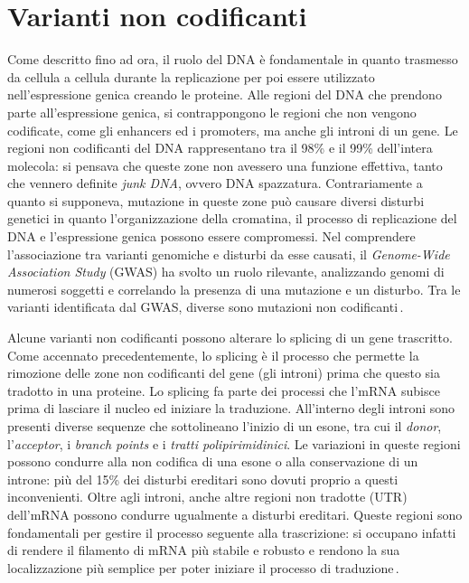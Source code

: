 \section{Varianti non codificanti}

Come descritto fino ad ora, il ruolo del \acs{DNA} è fondamentale in quanto trasmesso da cellula a cellula durante la replicazione per poi essere utilizzato nell'espressione genica creando le proteine. Alle regioni del \acs{DNA} che prendono parte all'espressione genica, si contrappongono le regioni che non vengono codificate, come gli enhancers ed i promoters, ma anche gli introni di un gene. Le regioni non codificanti del \acs{DNA} rappresentano tra il 98\% e il 99\% dell'intera molecola: si pensava che queste zone non avessero una funzione effettiva, tanto che vennero definite \textit{junk \acs{DNA}}, ovvero \acs{DNA} spazzatura. Contrariamente a quanto si supponeva, mutazione in queste zone può causare diversi disturbi genetici in quanto l'organizzazione della cromatina, il processo di replicazione del \acs{DNA} e l'espressione genica possono essere compromessi. Nel comprendere l'associazione tra varianti genomiche e disturbi da esse causati, il \textit{Genome-Wide Association Study} (\acs{GWAS}) ha svolto un ruolo rilevante, analizzando genomi di numerosi soggetti e correlando la presenza di una mutazione e un disturbo. Tra le varianti identificata dal \acs{GWAS}, diverse sono mutazioni non codificanti\,\cite{visscher2012five, zhang2015non, ludwig2002functional}.

Alcune varianti non codificanti possono alterare lo splicing di un gene trascritto. Come accennato precedentemente, lo splicing è il processo che permette la rimozione delle zone non codificanti del gene (gli introni) prima che questo sia tradotto in una proteine. Lo splicing fa parte dei processi che l'\acs{mRNA} subisce prima di lasciare il nucleo ed iniziare la traduzione. All'interno degli introni sono presenti diverse sequenze che sottolineano l'inizio di un esone, tra cui il \textit{donor}, l'\textit{acceptor}, i \textit{branch points} e i \textsl{tratti polipirimidinici}. Le variazioni in queste regioni possono condurre alla non codifica di una esone o alla conservazione di un introne: più del 15\% dei disturbi ereditari sono dovuti proprio a questi inconvenienti. Oltre agli introni, anche altre regioni non tradotte (\acs{UTR}) dell'\acs{mRNA} possono condurre ugualmente a disturbi ereditari. Queste regioni sono fondamentali per gestire il processo seguente alla trascrizione: si occupano infatti di rendere il filamento di \acs{mRNA} più stabile e robusto e rendono la sua localizzazione più semplice per poter iniziare il processo di traduzione\,\cite{khurana2016role, french2020role}. 

